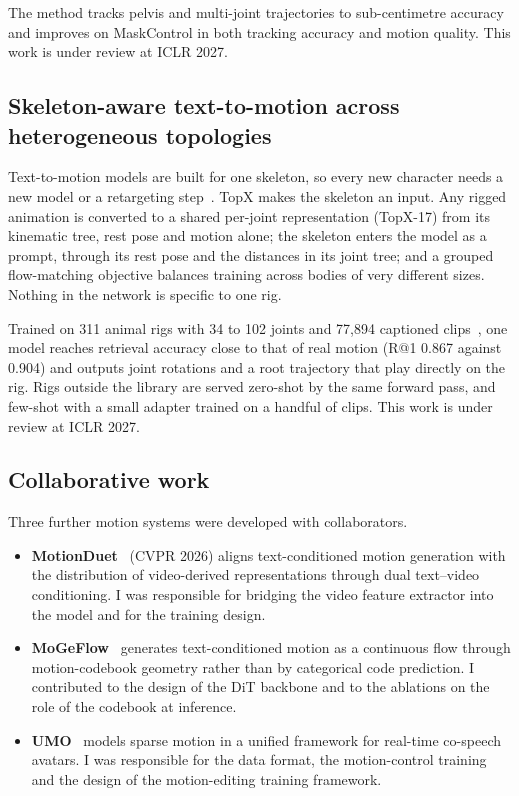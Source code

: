 \documentclass[11pt,a4paper]{report}
\begin{document}
The method tracks pelvis and multi-joint trajectories to sub-centimetre accuracy
and improves on MaskControl in both tracking accuracy and motion quality. This
work is under review at ICLR 2027.

\subsection{Skeleton-aware text-to-motion across heterogeneous topologies}

Text-to-motion models are built for one skeleton, so every new character needs
a new model or a retargeting step~\cite{aberman2020skeletonaware}. TopX makes
the skeleton an input. Any rigged animation is converted to a shared per-joint
representation (TopX-17) from its kinematic tree, rest pose and motion alone; the
skeleton enters the model as a prompt, through its rest pose and the distances
in its joint tree; and a grouped flow-matching objective balances training
across bodies of very different sizes. Nothing in the network is specific to
one rig.

Trained on 311 animal rigs with 34 to 102 joints and 77,894 captioned
clips~\cite{wang2025animo}, one model reaches retrieval accuracy close to that
of real motion (R@1 0.867 against 0.904) and outputs joint rotations and a root
trajectory that play directly on the rig. Rigs outside the library are served
zero-shot by the same forward pass, and few-shot with a small adapter trained on
a handful of clips. This work is under review at ICLR 2027.

\subsection{Collaborative work}

Three further motion systems were developed with collaborators.

\begin{itemize}
\item \textbf{MotionDuet}~\cite{zhang2026motionduet} (CVPR 2026) aligns
  text-conditioned motion generation with the distribution of video-derived
  representations through dual text--video conditioning. I was responsible for
  bridging the video feature extractor into the model and for the training
  design.
\item \textbf{MoGeFlow}~\cite{fang2026mogeflow} generates text-conditioned motion
  as a continuous flow through motion-codebook geometry rather than by
  categorical code prediction. I contributed to the design of the DiT backbone
  and to the ablations on the role of the codebook at inference.
\item \textbf{UMO}~\cite{zhan2026umo} models sparse motion in a unified framework
  for real-time co-speech avatars. I was responsible for the data format, the
  motion-control training and the design of the motion-editing training
  framework.
\end{itemize}
\end{document}
